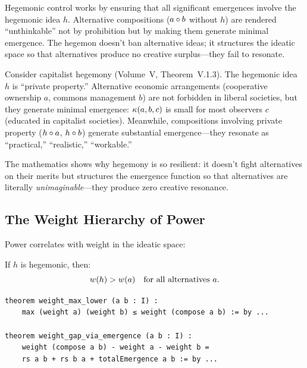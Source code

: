 \begin{interpretation}
Hegemonic control works by ensuring that all significant emergences involve
the hegemonic idea $h$. Alternative compositions ($a \circ b$ without $h$)
are rendered ``unthinkable'' not by prohibition but by making them generate
minimal emergence. The hegemon doesn't ban alternative ideas; it structures
the ideatic space so that alternatives produce no creative surplus---they
fail to resonate.

Consider capitalist hegemony (Volume~V, Theorem~V.1.3). The hegemonic idea
$h$ is ``private property.'' Alternative economic arrangements (cooperative
ownership $a$, commons management $b$) are not forbidden in liberal societies,
but they generate minimal emergence: $\kappa(a, b, c)$ is small for most
observers $c$ (educated in capitalist societies). Meanwhile, compositions
involving private property ($h \circ a$, $h \circ b$) generate substantial
emergence---they resonate as ``practical,'' ``realistic,'' ``workable.''

The mathematics shows why hegemony is so resilient: it doesn't fight
alternatives on their merits but structures the emergence function so that
alternatives are literally \emph{unimaginable}---they produce zero creative
resonance.
\end{interpretation}

\subsection{The Weight Hierarchy of Power}

Power correlates with weight in the ideatic space:

\begin{theorem}
\label{thm:weight-hegemonic-power}
If $h$ is hegemonic, then:
\[
  w(h) > w(a) \quad \text{for all alternatives } a.
\]
\end{theorem}

\begin{lstlisting}[caption={Weight bounds (IDT\_v3\_Emergence.lean)}]
theorem weight_max_lower (a b : I) :
    max (weight a) (weight b) ≤ weight (compose a b) := by ...
    
theorem weight_gap_via_emergence (a b : I) :
    weight (compose a b) - weight a - weight b =
    rs a b + rs b a + totalEmergence a b := by ...
\end{lstlisting}

